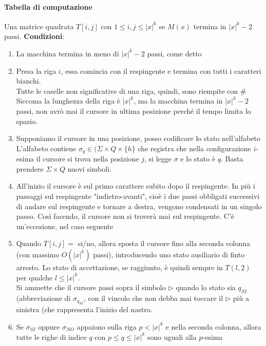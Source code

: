 \documentclass[10pt]{book}
\begin{document}
\paragraph{Tabella di computazione} Una matrice quadrata $T[i, j]$ con $1 \leq i,j \leq |x|^k$ se $M(x)$ termina in $|x|^k - 2$ passi. \textbf{Condizioni}:
\begin{enumerate}
	\item La macchina termina in meno di $|x|^k - 2$ passi, come detto
	\item Presa la riga $i$, essa comincia con il respingente e termina con tutti i caratteri bianchi.\\
	Tutte le caselle non significative di una riga, quindi, sono riempite con $\#$\\
	Siccoma la lunghezza della riga è $|x|^k$, ma la macchina termina in $|x|^k - 2$ passi, non avrò mai il cursore in ultima posizione perché il tempo limita lo spazio.
	\item Supponiamo il cursore in una posizione, posso codificare lo stato nell'alfabeto\\
	L'alfabeto contiene $\sigma_q \in (\Sigma \times Q \times \{h\}$ che registra che nella configurazione $i$-esima il cursore si trova nella posizione $j$, si legge $\sigma$ e lo stato è $q$. Basta prendere $\Sigma \times Q$ nuovi simboli.
	\item All'inizio il cursore è sul primo carattere subito dopo il respingente. In più i passaggi sul respingente "indietro-avanti", cioè i due passi obbligati successivi di andare sul respingente e tornare a destra, vengono condensati in un singolo passo. Così facendo, il cursore non si troverà mai sul respingente. C'è un'eccezione, nel caso seguente
	\item Quando $T[i, j] =$ si/no, allora sposta il cursore fino alla seconda colonna (con massimo $O(|x|^k)$ passi), introducendo uno stato ausiliario di finto arresto. Lo stato di accettazione, se raggiunto, è quindi sempre in $T(l, 2)$ per qualche $l \leq |x|^k$.\\
	Si ammette che il cursore passi sopra il simbolo $\triangleright$ quando lo stato sia $q_{SI}$ (abbreviazione di $\sigma_{q_{SI}}$, con il vincolo che non debba mai toccare il $\triangleright$ più a sinistra (che rappresenta l'inizio del nastro.
	\item Se $\sigma_{SI}$ oppure $\sigma_{NO}$ appaiono sulla riga $p<|x|^k$ e nella seconda colonna, allora tutte le righe di indice $q$ con $p\leq q \leq |x|^k$ sono uguali alla $p$-esima
\end{enumerate}
\end{document}
